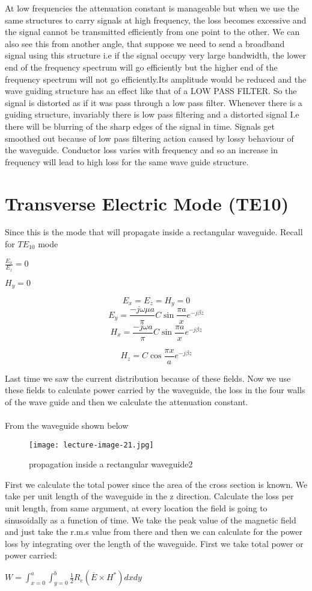 At low frequencies  the attenuation  constant  is manageable but when we use the same structures to carry signals at high frequency, the  loss becomes excessive and the signal cannot be transmitted  efficiently from one point to the other. We can also see this from another angle, that suppose we need to send a broadband signal using this  structure i.e if the signal occupy very large bandwidth, the lower  end of the frequency  spectrum will go efficiently but the higher end of the frequency spectrum  will not go efficiently.Its amplitude  would be reduced and the wave guiding structure has an effect like that of a LOW PASS FILTER. So the signal is distorted  as if it was pass through a low pass filter. 
Whenever  there is a guiding structure, invariably there is low pass filtering  and a distorted signal I.e there will be blurring  of the sharp edges of the signal in time. Signals get smoothed out because of low pass filtering action caused by lossy behaviour of the waveguide. Conductor loss varies with frequency and so an increase  in frequency will lead to high loss for the same wave guide structure. 
\section{Transverse Electric Mode (TE10)}
Since this is the mode that will propagate inside a rectangular waveguide. Recall for
$TE_{10}$ mode
\begin{center}
	$\frac{E_x}{E_z}=0$
	
	$H_y=0$	
\end{center}
$$
E_{x} = E_{z} = H_{y} = 0
$$	
$$
E_{y} = \dfrac{-j\omega\mu a }{\pi} C\sin \dfrac{\pi a}{x} e ^{-j\beta z}
$$
$$
H_{x} = \dfrac{-j\omega a}{\pi} C \sin\dfrac{\pi a}{x}
e^{-j\beta z} 
$$

$$
H_{z} = C\cos \dfrac{\pi x}{a} e^{-j\beta z}
$$


Last time we saw the current distribution because of these fields. Now we use  these fields to calculate power carried by the waveguide, the loss in the four walls of the wave guide and then we calculate the attenuation constant.\\\\ 
From the waveguide shown below

\begin{figure}[H]
	\centering
	\texttt{[image: lecture-image-21.jpg]}
	\caption{propagation inside a rectangular waveguide2}
\end{figure}


First we calculate the total power since the area of the cross section is known. We take per unit length of the waveguide in the z direction. Calculate the loss per unit length, from same argument, at every location the field is going to sinusoidally as a function of time.
We take the peak value of the magnetic field and just take  the r.m.s value from there and then  we can calculate for the power loss by integrating over the length of the waveguide.
First we take total power or power carried:
\begin{center}
	$W= \int_{x=0}^{a}\int_{y=0}^{b}\frac{1}{2}R_e(\overline{E} \times H^*)dxdy$
\end{center}



